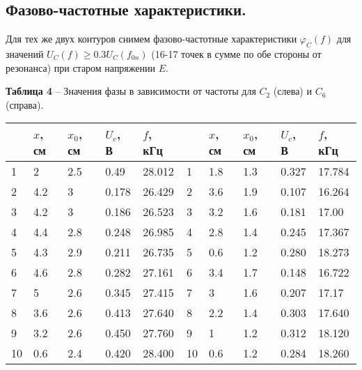 \documentclass[12pt,a4paper]{article}
\begin{document}
    \subsection{Фазово-частотные характеристики.}
        Для тех же двух контуров снимем фазово-частотные характеристики $\varphi_C(f)$ для значений $U_C(f) \geq 0.3U_C(f_{0n})$ (16-17 точек в сумме по обе стороны от резонанса) при старом напряжении $E$.
        
        \begin{table}[!h]
            \begin{center}
           		\textbf{Таблица 4} -- Значения фазы в зависимости от частоты для $C_2$ (слева) и $C_6$ (справа). \\
                \begin{tabular}{ | l | l | l | l | l | l | l | l | l | l |}
                    \hline
                       & $x$, см& $x_0$, см & $U_c$, В  & $f$, кГц  &    & $x$, см  & $x_0$, см & $U_c$, В  & $f$, кГц     \\
                    \hline
                    1  & 2      & 2.5       & 0.49      & 28.012    & 1  & 1.8      & 1.3       & 0.327     & 17.784  \\
                    2  & 4.2    & 3         & 0.178     & 26.429    & 2  & 3.6      & 1.9       & 0.107     & 16.264  \\
                    3  & 4.2    & 3         & 0.186     & 26.523    & 3  & 3.2      & 1.6       & 0.181     & 17.00   \\
                    4  & 4.4    & 2.8       & 0.248     & 26.985    & 4  & 2.8      & 1.4       & 0.245     & 17.367  \\
                    5  & 4.3    & 2.9       & 0.211     & 26.735    & 5  & 0.6      & 1.2       & 0.280     & 18.273  \\
                    6  & 4.6    & 2.8       & 0.282     & 27.161    & 6  & 3.4      & 1.7       & 0.148     & 16.722  \\
                    7  & 5      & 2.6       & 0.345     & 27.415    & 7  & 3        & 1.6       & 0.207     & 17.17   \\
                    8  & 3.6    & 2.6       & 0.413     & 27.640    & 8  & 2.2      & 1.4       & 0.303     & 17.640  \\
                    9  & 3.2    & 2.6       & 0.450     & 27.760    & 9  & 1        & 1.2       & 0.312     & 18.120  \\
                    10 & 0.6    & 2.4       & 0.420     & 28.400    & 10 & 0.6      & 1.2       & 0.284     & 18.260  \\

\end{tabular}
\end{center}
\end{table}
\end{document}
